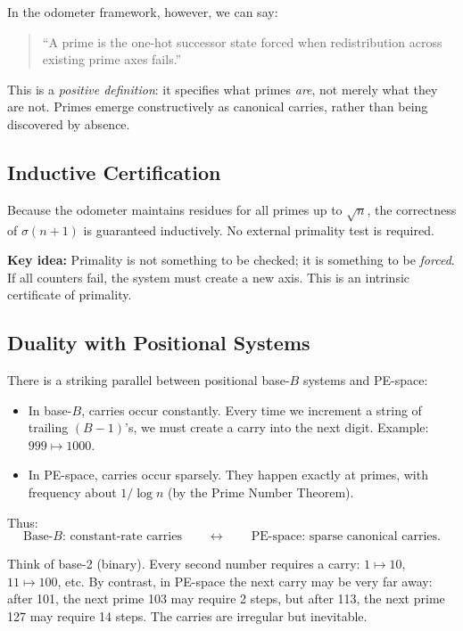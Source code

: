 \documentclass[11pt]{article}
\theoremstyle{definition}
\begin{document}
In the odometer framework, however, we can say:
\begin{quote}
``A prime is the one-hot successor state forced when redistribution across existing prime axes fails.''
\end{quote}

This is a \emph{positive definition}: it specifies what primes \emph{are}, not merely what they are not.  
Primes emerge constructively as canonical carries, rather than being discovered by absence.

\subsection{Inductive Certification}

Because the odometer maintains residues for all primes up to $\sqrt{n}$, 
the correctness of $\sigma(n+1)$ is guaranteed inductively.  
No external primality test is required.  

\begin{studentnote}
\textbf{Key idea:}  
Primality is not something to be checked; it is something to be \emph{forced}.  
If all counters fail, the system must create a new axis.  
This is an intrinsic certificate of primality.
\end{studentnote}

\subsection{Duality with Positional Systems}

There is a striking parallel between positional base-$B$ systems and PE-space:

\begin{itemize}
  \item In base-$B$, carries occur constantly.  
        Every time we increment a string of trailing $(B-1)$’s, 
        we must create a carry into the next digit.  
        Example: $999 \mapsto 1000$.
  \item In PE-space, carries occur sparsely.  
        They happen exactly at primes, with frequency about $1 / \log n$ 
        (by the Prime Number Theorem).
\end{itemize}

Thus:
\[
\text{Base-$B$: constant-rate carries} \qquad 
\longleftrightarrow \qquad
\text{PE-space: sparse canonical carries}.
\]

\begin{studentexample}
Think of base-2 (binary). Every second number requires a carry: $1 \mapsto 10$, $11 \mapsto 100$, etc.  
By contrast, in PE-space the next carry may be very far away: 
after 101, the next prime 103 may require 2 steps, 
but after 113, the next prime 127 may require 14 steps.  
The carries are irregular but inevitable.
\end{studentexample}
\end{document}
